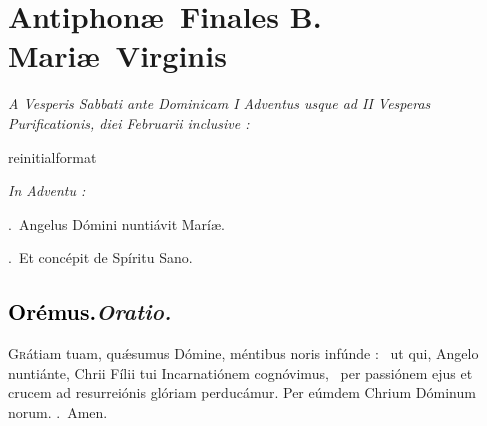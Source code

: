 \documentclass[12pt]{article} %
\newcommand{\myaboveinitial}[1]{%
    \expandafter\renewcommand\csname greinitialformat\endcsname[1]{%
        \fontsize{43}{43}\selectfont ##1
    }
    \gresetfirstlineaboveinitial{\textcolor{benred8}{\raisebox{6.0mm}{\small \textsc{\textbf{#1}}}}}{}
}
\newenvironment{rubric}{\vspace{1 mm}\color{benred8} \itshape \leftskip 0in \setlength{\parindent}{0.25in}}{\vspace{1 mm}}
\newenvironment{response}{\leftskip 0in \setlength{\parindent}{0in}}{\vspace{1 mm}}
\let\oldgresixstar\gresixstar
\renewcommand{\gresixstar}{\textcolor{benred8}{\oldgresixstar}}
\let\oldgredagger\gredagger
\renewcommand{\gredagger}{\textcolor{benred8}{\oldgredagger}}
\let\oldVbar\Vbar
\renewcommand{\Vbar}{\textcolor{benred8}{\oldVbar .}}
\let\oldRbar\Rbar
\renewcommand{\Rbar}{\textcolor{benred8}{\oldRbar .}}
\def\capitulumSpace{\hspace{20 mm}}
\begin{document}
\newpage


\section*{Antiphon\ae\ Finales B. Mari\ae\ Virginis}
\label{sec:AntBMV}

\thispagestyle{plain}


\begin{rubric}
\hspace*{25pt}A Vesperis Sabbati ante Dominicam I Adventus usque ad II Vesperas Purificationis, diei Februarii inclusive :

\end{rubric}


\myaboveinitial{V}

\vspace{2mm}

\begin{rubric}
In Adventu :

\end{rubric}

\begin{response}
\Vbar\ Angelus D\'{o}mini nunti\'{a}vit Mar\'{i}\ae .

\Rbar\ Et conc\'{e}pit de Sp\'{i}ritu Sano.

\end{response}

\subsection*{\textcolor{black}{Or\'{e}mus.}\capitulumSpace \emph{Oratio.}}

\begin{response}\lettrine{G}{r}\'{a}tiam tuam, qu\'{\ae}sumus D\'{o}mine, m\'{e}ntibus noris inf\'{u}nde : \gredagger\ ut qui, Angelo nunti\'{a}nte, Chrii F\'{i}lii tui Incarnati\'{o}nem cogn\'{o}vimus, \gresixstar\ per passi\'{o}nem ejus et crucem ad resurrei\'{o}nis gl\'{o}riam perduc\'{a}mur. Per e\'{u}mdem Chrium D\'{o}minum norum. \Rbar\ Amen.

\end{response}
\end{document}
